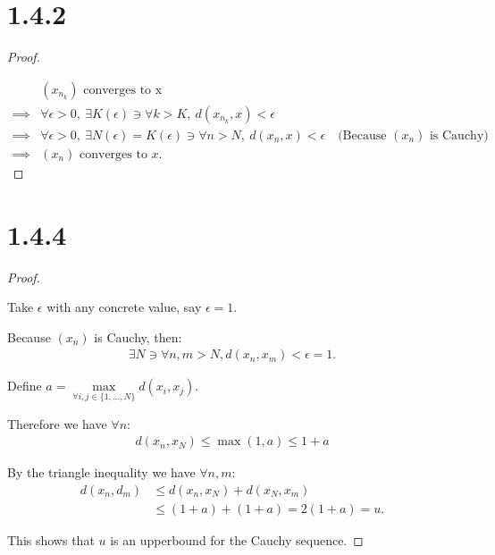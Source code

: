 \documentclass{article}
\begin{document}
\newpage

\section*{1.4.2}
\begin{proof}
  $ $

  \begin{align*}
    & (x_{n_k}) \text{ converges to x} \\
    \implies& \forall \epsilon > 0, \: \exists K(\epsilon) \ni \forall k > K, \: d(x_{n_k}, x) < \epsilon \\
    \implies& \forall \epsilon > 0, \: \exists N(\epsilon) = K(\epsilon) \ni \forall n > N, \: d(x_n, x) < \epsilon \quad \text{(Because $(x_n)$ is Cauchy)} \\
    \implies& (x_n) \text{ converges to } x.
  \end{align*} 

\end{proof}

\section*{1.4.4}
\begin{proof}
  $ $

  Take $\epsilon$ with any concrete value, say $\epsilon = 1$.
  \newline

  Because $(x_n)$ is Cauchy, then:
  \begin{align*}
    \exists N \ni \forall n,m > N, d(x_n, x_m) < \epsilon = 1. 
  \end{align*}

  Define $a = \max\limits_{\forall i,j \in \{1, \ldots, N\}} d(x_i, x_j)$.
  \newline

  Therefore we have $\forall n$:
  \begin{align*}
    d(x_n, x_N) \leq \max(1, a) \leq 1 + a
  \end{align*}

  By the triangle inequality we have $\forall n, m$:
  \begin{align*}
    d(x_n, d_m) &\leq d(x_n, x_N) + d(x_N, x_m) \\
    &\leq (1+a) + (1+a) = 2(1+a) = u.
  \end{align*}
  
  This shows that $u$ is an upperbound for the Cauchy sequence.

\end{proof}
\end{document}
